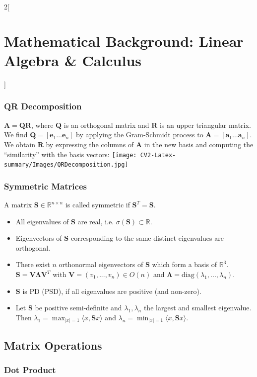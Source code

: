 \documentclass[oneside,fontsize=11pt,paper=a4]{scrartcl}
\begin{document}
\begin{multicols}{2}[\section{Mathematical Background: Linear Algebra \& Calculus}]
\subsubsection{QR Decomposition}
$\mathbf{A}=\mathbf{Q}\mathbf{R}$, where $\mathbf{Q}$ is an orthogonal matrix and $\mathbf{R}$ is an upper triangular matrix. We find $\mathbf{Q}=[\mathbf{e}_1\dots\mathbf{e}_n]$ by applying the Gram-Schmidt process to $\mathbf{A}=[\mathbf{a}_1\dots\mathbf{a}_n]$. We obtain $\mathbf{R}$ by expressing the columns of $\mathbf{A}$ in the new basis and computing the ``similarity'' with the basis vectors:
\texttt{[image: CV2-Latex-summary/Images/QRDecomposition.jpg]}

\subsubsection{Symmetric Matrices}
A matrix $\mathbf{S} \in \mathbb{R}^{n \times n}$ is called symmetric if $\mathbf{S}^T = \mathbf{S}$.
\begin{itemize}
    \setlength\itemsep{-0.1em}
    \item All eigenvalues of $\mathbf{S}$ are real, i.e. $\sigma(\mathbf{S}) \subset \mathbb{R}$.
    \item Eigenvectors of $\mathbf{S}$ corresponding to the same distinct eigenvalues are orthogonal.
    \item There exist $n$ orthonormal eigenvectors of $\mathbf{S}$ which form a basis of $\mathbb{R}^3$. $\mathbf{S} = \mathbf{V \Lambda V}^T$ with $\mathbf{V} = (v_1, ..., v_n) \in O(n)$ and $\mathbf{\Lambda} = \text{diag}(\lambda_1, ..., \lambda_n)$.
    \item $\mathbf{S}$ is PD (PSD), if all eigenvalues are positive (and non-zero).
    \item Let $\mathbf{S}$ be positive semi-definite and $\lambda_1, \lambda_n$ the largest and smallest eigenvalue. Then $\lambda_1 = \max_{|x|=1} \langle x, \mathbf{S}x \rangle$ and $\lambda_n = \min_{|x|=1} \langle x, \mathbf{S}x \rangle$.
\end{itemize}



\subsection{Matrix Operations}

\subsubsection{Dot Product}


\end{multicols}
\end{document}
